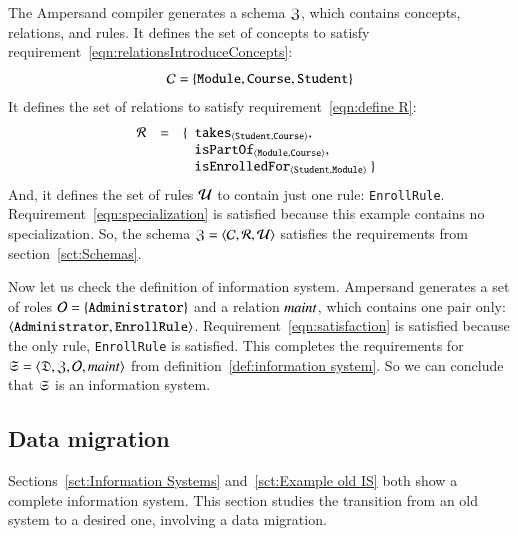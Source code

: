 \documentclass{elsarticle}
\begin{document}
   The Ampersand compiler generates a schema $\mathfrak{Z}$, which contains concepts, relations, and rules.
   It defines the set of concepts to satisfy requirement~\ref{eqn:relationsIntroduceConcepts}:
   \[\mathcal{C}=\{ {\tt Module}, {\tt Course}, {\tt Student}\}\]
   It defines the set of relations to satisfy requirement~\ref{eqn:define R}:
   \[\begin{array}{rcl}
      \rels&=&\{\begin{array}[t]{l}
                  \declare{\tt takes}{\tt Student}{\tt Course},\\
                  \declare{\tt isPartOf}{\tt Module}{\tt Course},\\
                  \declare{\tt isEnrolledFor}{\tt Student}{\tt Module}\ \}
                \end{array}
     \end{array}
   \]
   And, it defines the set of rules $\mathcal{U}$ to contain just one rule: \verb-EnrollRule-.
   Requirement~\ref{eqn:specialization} is satisfied because this example contains no specialization.
   So, the schema $\mathfrak{Z}=\langle{\mathcal{C}},{\mathcal{R}},{\mathcal{U}}\rangle$ satisfies the requirements from section~\ref{sct:Schemas}.

   Now let us check the definition of information system.
   Ampersand generates a set of roles $\mathcal{O}=\{{\tt Administrator}\}$ and
   a relation $\text{\it maint\/}$, which contains one pair only: $\langle{{\tt Administrator}},{{\tt EnrollRule}}\rangle$.
   Requirement~\ref{eqn:satisfaction} is satisfied because the only rule, {\tt EnrollRule} is satisfied.
   This completes the requirements for $\mathfrak{S}=\langle\mathfrak{D},\mathfrak{Z},\mathcal{O},\text{\it maint\/}\rangle$ from definition~\ref{def:information system}.
   So we can conclude that $\mathfrak{S}$ is an  information system.

\subsection{Data migration}
   Sections~\ref{sct:Information Systems} and~\ref{sct:Example old IS} both show a complete information system.
   This section studies the transition from an old system to a desired one, involving a data migration.
\end{document}
